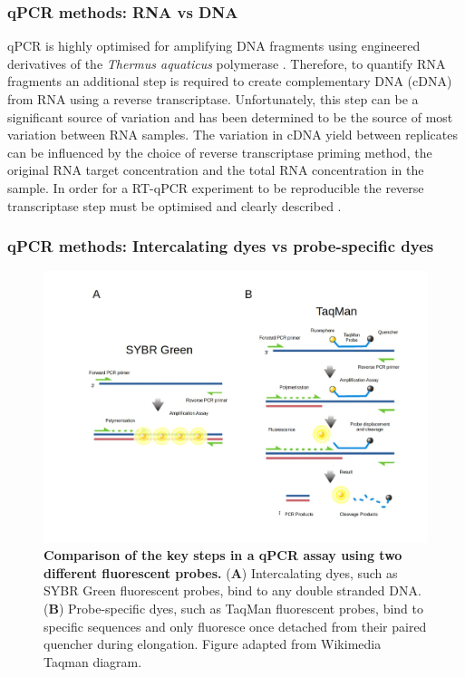 \documentclass[../main.tex]{subfiles}
\begin{document}
\subsubsection{qPCR methods: RNA vs DNA}

qPCR is highly optimised for amplifying DNA fragments using engineered derivatives of the \textit{Thermus aquaticus} polymerase \parencite{Witte2018}. 
Therefore, to quantify RNA fragments an additional step is required to create complementary DNA (cDNA) from RNA using a reverse transcriptase. 
Unfortunately, this step can be a significant source of variation and has been determined to be the source of most variation between RNA samples. 
The variation in cDNA yield between replicates can be influenced by the choice of reverse transcriptase priming method, the original RNA target concentration and the total RNA concentration in the sample. 
In order for a RT-qPCR experiment to be reproducible the reverse transcriptase step must be optimised and clearly described \parencite{Stahlberg2004}. 

\subsubsection{qPCR methods: Intercalating dyes vs probe-specific dyes}

\begin{figure}[h]

{\centering \includegraphics[width=\linewidth]{figures/taqmanvssybrgreen} 

}

\caption[Key steps in a qPCR assay.]{\textbf{Comparison of the key steps in a qPCR assay using two different fluorescent probes.} (\textbf{A}) Intercalating dyes, such as SYBR Green fluorescent probes, bind to any double stranded DNA. (\textbf{B}) Probe-specific dyes, such as TaqMan fluorescent probes, bind to specific sequences and only fluoresce once detached from their paired quencher during elongation. Figure adapted from Wikimedia Taqman diagram.}\label{fig:qpcr-fluo-tech}
\end{figure}
\end{document}
